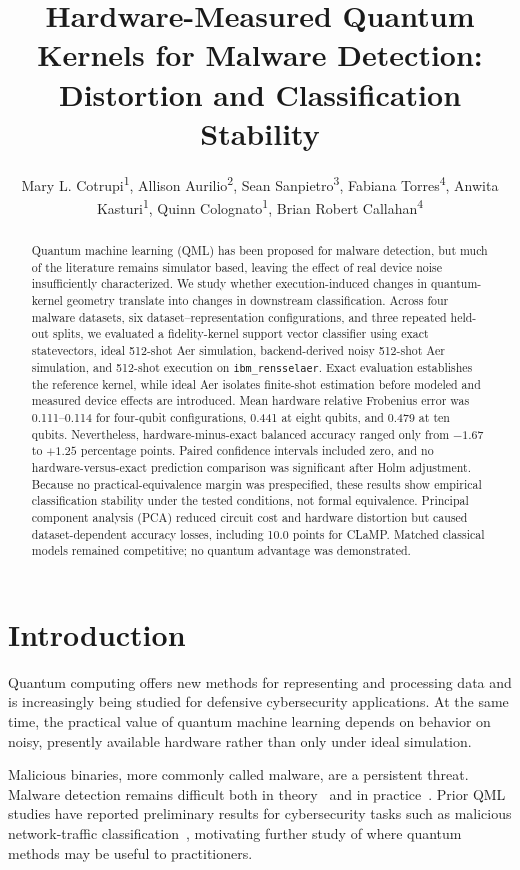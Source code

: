 \documentclass[letterpaper]{article} %
\title{Hardware-Measured Quantum Kernels for Malware Detection: Distortion and Classification Stability}
\author{
    Mary L. Cotrupi\textsuperscript{\rm 1}, Allison Aurilio\textsuperscript{\rm 2}, Sean Sanpietro\textsuperscript{\rm 3}, Fabiana Torres\textsuperscript{\rm 4}, Anwita Kasturi\textsuperscript{\rm 1}, Quinn Colognato\textsuperscript{\rm 1}, Brian Robert Callahan\textsuperscript{\rm 4}
}
\begin{document}
\maketitle

\begin{abstract}
Quantum machine learning (QML) has been proposed for malware detection, but much of the literature remains simulator based, leaving the effect of real device noise insufficiently characterized. We study whether execution-induced changes in quantum-kernel geometry translate into changes in downstream classification. Across four malware datasets, six dataset--representation configurations, and three repeated held-out splits, we evaluated a fidelity-kernel support vector classifier using exact statevectors, ideal 512-shot Aer simulation, backend-derived noisy 512-shot Aer simulation, and 512-shot execution on \texttt{ibm\_rensselaer}. Exact evaluation establishes the reference kernel, while ideal Aer isolates finite-shot estimation before modeled and measured device effects are introduced. Mean hardware relative Frobenius error was 0.111--0.114 for four-qubit configurations, 0.441 at eight qubits, and 0.479 at ten qubits. Nevertheless, hardware-minus-exact balanced accuracy ranged only from $-1.67$ to $+1.25$ percentage points. Paired confidence intervals included zero, and no hardware-versus-exact prediction comparison was significant after Holm adjustment. Because no practical-equivalence margin was prespecified, these results show empirical classification stability under the tested conditions, not formal equivalence. Principal component analysis (PCA) reduced circuit cost and hardware distortion but caused dataset-dependent accuracy losses, including 10.0 points for CLaMP. Matched classical models remained competitive; no quantum advantage was demonstrated.
\end{abstract}

\section{Introduction}

Quantum computing offers new methods for representing and processing data and is increasingly being studied for defensive cybersecurity applications. At the same time, the practical value of quantum machine learning depends on behavior on noisy, presently available hardware rather than only under ideal simulation.

Malicious binaries, more commonly called malware, are a persistent threat. Malware detection remains difficult both in theory~\cite{cohen1987computer} and in practice~\cite{pachhala}. Prior QML studies have reported preliminary results for cybersecurity tasks such as malicious network-traffic classification~\cite{cotrupi}, motivating further study of where quantum methods may be useful to practitioners.
\end{document}
